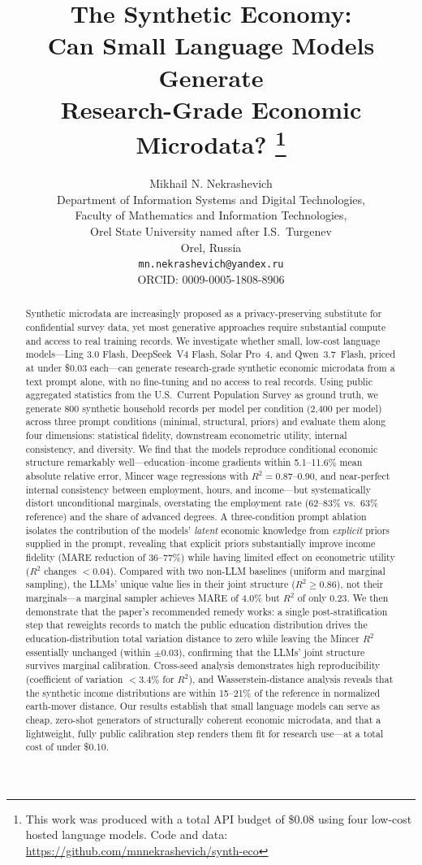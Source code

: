 \documentclass[11pt]{article}
\title{The Synthetic Economy:\\
Can Small Language Models Generate\\
Research-Grade Economic Microdata?%
\thanks{This work was produced with a total API budget of \$0.08 using four low-cost hosted language models. Code and data: \url{https://github.com/mnnekrashevich/synth-eco}}}
\author{
  Mikhail N. Nekrashevich\\
  Department of Information Systems and Digital Technologies,\\
  Faculty of Mathematics and Information Technologies,\\
  Orel State University named after I.S.\ Turgenev\\
  Orel, Russia\\
  \texttt{mn.nekrashevich@yandex.ru}\\
  ORCID: 0009-0005-1808-8906
}
\date{}
\begin{document}
\maketitle

\begin{abstract}
Synthetic microdata are increasingly proposed as a privacy-preserving substitute for confidential survey data, yet most generative approaches require substantial compute and access to real training records.
We investigate whether small, low-cost language models---Ling 3.0 Flash, DeepSeek~V4 Flash, Solar Pro~4, and Qwen~3.7~Flash, priced at under \$0.03 each---can generate research-grade synthetic economic microdata from a text prompt alone, with no fine-tuning and no access to real records.
Using public aggregated statistics from the U.S.\ Current Population Survey as ground truth, we generate 800 synthetic household records per model per condition (2{,}400 per model) across three prompt conditions (minimal, structural, priors) and evaluate them along four dimensions: statistical fidelity, downstream econometric utility, internal consistency, and diversity.
We find that the models reproduce conditional economic structure remarkably well---education--income gradients within 5.1--11.6\% mean absolute relative error, Mincer wage regressions with $R^2 = 0.87$--0.90, and near-perfect internal consistency between employment, hours, and income---but systematically distort unconditional marginals, overstating the employment rate (62--83\% vs.\ 63\% reference) and the share of advanced degrees.
A three-condition prompt ablation isolates the contribution of the models' \emph{latent} economic knowledge from \emph{explicit} priors supplied in the prompt, revealing that explicit priors substantially improve income fidelity (MARE reduction of 36--77\%) while having limited effect on econometric utility ($R^2$ changes $< 0.04$).
Compared with two non-LLM baselines (uniform and marginal sampling), the LLMs' unique value lies in their joint structure ($R^2 \geq 0.86$), not their marginals---a marginal sampler achieves MARE of 4.0\% but $R^2$ of only 0.23.
We then demonstrate that the paper's recommended remedy works: a single post-stratification step that reweights records to match the public education distribution drives the education-distribution total variation distance to zero while leaving the Mincer $R^2$ essentially unchanged (within $\pm 0.03$), confirming that the LLMs' joint structure survives marginal calibration.
Cross-seed analysis demonstrates high reproducibility (coefficient of variation $< 3.4\%$ for $R^2$), and Wasserstein-distance analysis reveals that the synthetic income distributions are within 15--21\% of the reference in normalized earth-mover distance.
Our results establish that small language models can serve as cheap, zero-shot generators of structurally coherent economic microdata, and that a lightweight, fully public calibration step renders them fit for research use---at a total cost of under \$0.10.
\end{abstract}
\end{document}
